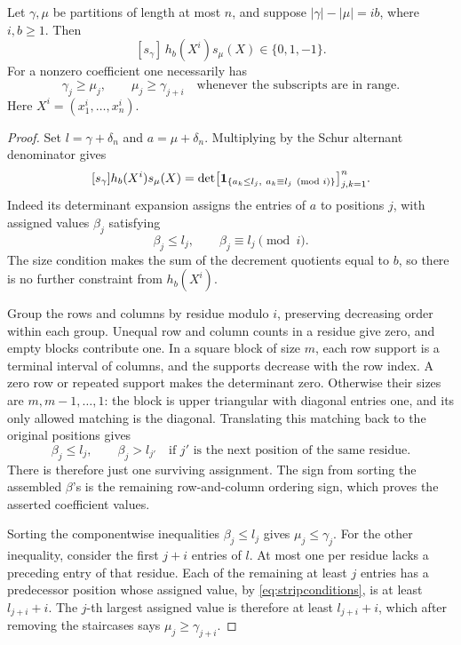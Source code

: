 \begin{lemma}\label{lem:strips}
Let \(\gamma,\mu\) be partitions of length at most \(n\), and suppose
\(|\gamma|-|\mu|=ib\), where \(i,b\ge1\). Then
\[
                  [s_\gamma]\,h_b(X^i)s_\mu(X)\in\{0,1,-1\}.
\]
For a nonzero coefficient one necessarily has
\[
        \gamma_j\ge\mu_j,\qquad \mu_j\ge\gamma_{j+i}
                         \quad\text{whenever the subscripts are in range}.
\]
Here \(X^i=(x_1^i,\ldots,x_n^i)\).
\end{lemma}
\begin{proof}
Set \(l=\gamma+\delta_n\) and \(a=\mu+\delta_n\).
Multiplying by the Schur alternant denominator
\cite[Chapter~I, equation~(3.1)]{Macdonald1995} gives
\[
 [s_\gamma]h_b(X^i)s_\mu(X)
 =\det\bigl[\boldsymbol 1_{\{a_k\le l_j,\ a_k\equiv l_j\pmod i\}}\bigr]_{j,k=1}^n.
\]
Indeed its determinant expansion assigns the entries of \(a\) to
positions \(j\), with assigned values \(\beta_j\) satisfying
\[
                  \beta_j\le l_j,\qquad \beta_j\equiv l_j\pmod i.
\]
The size condition makes the sum of the decrement quotients equal to
\(b\), so there is no further constraint from \(h_b(X^i)\).

Group the rows and columns by residue modulo \(i\), preserving decreasing
order within each group. Unequal row and column counts in a residue give
zero, and empty blocks contribute one. In a square block of size \(m\),
each row support is a terminal interval of columns, and the supports
decrease with the row index. A zero row or repeated support makes the
determinant zero. Otherwise their sizes are \(m,m-1,\ldots,1\): the block
is upper triangular with diagonal entries one, and its only allowed
matching is the diagonal. Translating this matching back to the original
positions gives
\begin{equation}\label{eq:stripconditions}
 \beta_j\le l_j,\qquad \beta_j>l_{j'}
      \quad\text{if \(j'\) is the next position of the same residue}.
\end{equation}
There is therefore just one surviving assignment. The sign from sorting
the assembled \(\beta\)'s is the remaining row-and-column ordering sign,
which proves the asserted coefficient values.

Sorting the componentwise inequalities \(\beta_j\le l_j\) gives
\(\mu_j\le\gamma_j\). For the other inequality, consider the first \(j+i\)
entries of \(l\). At most one per residue lacks a preceding entry of
that residue. Each of the remaining at least \(j\) entries has a
predecessor position whose assigned value, by
\eqref{eq:stripconditions}, is at least \(l_{j+i}+i\).
The \(j\)-th largest assigned value is therefore at least
\(l_{j+i}+i\), which after removing the staircases says
\(\mu_j\ge\gamma_{j+i}\).
\end{proof}

